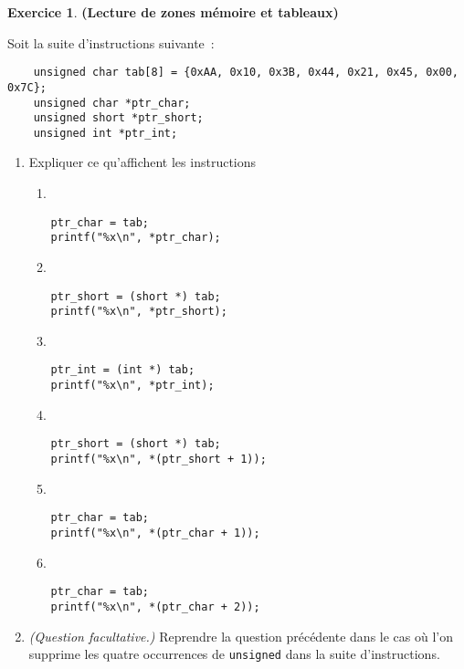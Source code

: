 \documentclass[12pt]{article}
\theoremstyle{definition}
\newtheorem{Exercice}{Exercice}
\begin{document}
\begin{Exercice} {\bf (Lecture de zones mémoire et tableaux)}\smallskip

Soit la suite d'instructions suivante~:
\begin{lstlisting}
    unsigned char tab[8] = {0xAA, 0x10, 0x3B, 0x44, 0x21, 0x45, 0x00, 0x7C};
    unsigned char *ptr_char;
    unsigned short *ptr_short;
    unsigned int *ptr_int;
\end{lstlisting}
\begin{enumerate}
    \item Expliquer ce qu'affichent les instructions
    \begin{multicols}{2}
    \begin{enumerate}
        \item ~
\begin{lstlisting}
ptr_char = tab;
printf("%x\n", *ptr_char);
\end{lstlisting}
    \smallskip

    \item ~
\begin{lstlisting}
ptr_short = (short *) tab;
printf("%x\n", *ptr_short);
\end{lstlisting}
    \smallskip

    \item ~
\begin{lstlisting}
ptr_int = (int *) tab;
printf("%x\n", *ptr_int);
\end{lstlisting}
    \smallskip

    \item ~
\begin{lstlisting}
ptr_short = (short *) tab;
printf("%x\n", *(ptr_short + 1));
\end{lstlisting}
    \smallskip

    \item ~
\begin{lstlisting}
ptr_char = tab;
printf("%x\n", *(ptr_char + 1));
\end{lstlisting}
    \smallskip

    \item ~
\begin{lstlisting}
ptr_char = tab;
printf("%x\n", *(ptr_char + 2));
\end{lstlisting}
    \end{enumerate}
    \end{multicols}

    \item {\em (Question facultative.)} Reprendre la question
    précédente dans le cas où l'on supprime les quatre occurrences
    de {\tt unsigned} dans la suite d'instructions.
\end{enumerate}
\end{Exercice}
\bigskip
\end{document}
